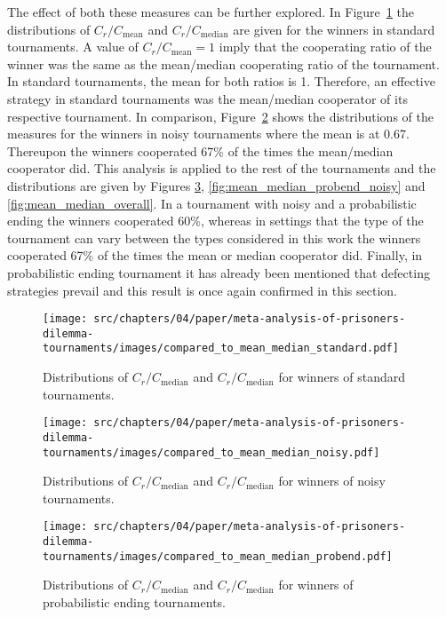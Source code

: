 The effect of both these measures can be further explored. In
Figure~\ref{fig:mean_median_std} the distributions of \(C_r / C_{\text{mean}}\)
and \(C_r / C_{\text{median}}\) are given for the winners in standard tournaments. A value of \(C_r /
C_{\text{mean}} = 1\) imply that the cooperating ratio of the winner was the
same as the mean/median cooperating ratio of the tournament. In standard tournaments, the mean
for both ratios is 1. Therefore, an effective strategy in standard tournaments
was the mean/median cooperator of its respective tournament. In comparison,
Figure~\ref{fig:mean_median_noisy} shows the distributions of the measures for
the winners in noisy tournaments where the mean is at 0.67. Thereupon the winners
cooperated 67\% of the times the mean/median cooperator did. This analysis is
applied to the rest of the tournaments and the distributions are given by
Figures \ref{fig:mean_median_probend}, \ref{fig:mean_median_probend_noisy} and
\ref{fig:mean_median_overall}. In a tournament with noisy and a probabilistic
ending the winners cooperated 60\%, whereas in settings that the type of the
tournament can vary between the types considered in this work the winners
cooperated 67\% of the times the mean or median cooperator did. Finally, in
probabilistic ending tournament it has already been mentioned that defecting
strategies prevail and this result is once again confirmed in this section.

\begin{figure}[!htbp]
    \centering
    \texttt{[image: src/chapters/04/paper/meta-analysis-of-prisoners-dilemma-tournaments/images/compared\_to\_mean\_median\_standard.pdf]}
    \caption{Distributions of \(C_r / C_{\text{median}}\)
    and \(C_r / C_{\text{median}}\) for winners of standard tournaments.}\label{fig:mean_median_std}
\end{figure}

\begin{figure}[!htbp]
    \centering
    \texttt{[image: src/chapters/04/paper/meta-analysis-of-prisoners-dilemma-tournaments/images/compared\_to\_mean\_median\_noisy.pdf]}
    \caption{Distributions of \(C_r / C_{\text{median}}\)
    and \(C_r / C_{\text{median}}\) for winners of noisy tournaments.}\label{fig:mean_median_noisy}
\end{figure}

\begin{figure}[!htbp]
    \centering
    \texttt{[image: src/chapters/04/paper/meta-analysis-of-prisoners-dilemma-tournaments/images/compared\_to\_mean\_median\_probend.pdf]}
    \caption{Distributions of \(C_r / C_{\text{median}}\)
    and \(C_r / C_{\text{median}}\) for winners of probabilistic ending tournaments.}\label{fig:mean_median_probend}
\end{figure}

